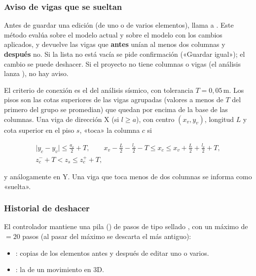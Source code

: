 \subsubsection{Aviso de vigas que se sueltan}
\label{sec:mod-sueltas}

Antes de guardar una edición (de uno o de varios elementos),  llama a
. Este método evalúa
 sobre el modelo actual y sobre el modelo con los
cambios aplicados, y devuelve las vigas que \textbf{antes} unían al menos dos columnas y \textbf{después} no. Si la lista
no está vacía se pide confirmación («Guardar igual»); el cambio se puede deshacer. Si el proyecto no tiene columnas o
vigas (el análisis lanza ), no hay aviso.

El criterio de conexión es el del análisis sísmico, con tolerancia $T = 0{,}05$\,m. Los pisos son las cotas superiores
de las vigas agrupadas (valores a menos de $T$ del primero del grupo se promedian) que quedan por encima de la base de
las columnas. Una viga de dirección X (si $l \ge a$), con centro $(x_v, y_v)$, longitud $L$ y cota superior en el piso
$s$, «toca» la columna $c$ si

\begin{gather}
	\lvert y_c - y_v \rvert \le \tfrac{a_c}{2} + T, \qquad
	x_v - \tfrac{L}{2} - \tfrac{l_c}{2} - T \le x_c \le x_v + \tfrac{L}{2} + \tfrac{l_c}{2} + T, \\
	z^{-}_c + T < z_s \le z^{+}_c + T,
\end{gather}

\noindent y análogamente en Y. Una viga que toca menos de dos columnas se informa como «suelta».

\subsubsection{Historial de deshacer}

El controlador mantiene una pila () de pasos de tipo sellado , con un máximo de
 $= 20$ pasos (al pasar del máximo se descarta el más antiguo):

\begin{itemize}
	\item {}: copias de los elementos antes y después de editar uno o varios.
	\item {}: la  de un movimiento en 3D.
\end{itemize}

